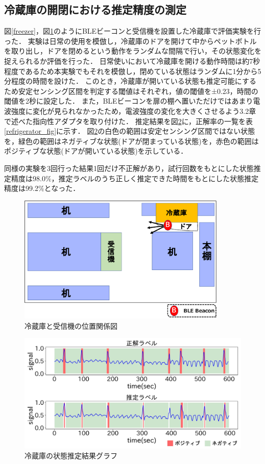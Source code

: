 \subsection{冷蔵庫の開閉における推定精度の測定}
図\ref{freezer}，図\ref{refrigerator_position}のようにBLEビーコンと受信機を設置した冷蔵庫で評価実験を行った．
実験は日常の使用を模倣し，冷蔵庫のドアを開けて中からペットボトルを取り出し，ドアを閉めるという動作をランダムな間隔で行い，その状態変化を捉えられるか評価を行った．
日常使いにおいて冷蔵庫を開ける動作時間は約7秒程度であるため本実験でもそれを模倣し，閉めている状態はランダムに1分から5分程度の時間を設けた．
このとき，冷蔵庫が開いている状態も推定可能にするため安定センシング区間を判定する閾値はそれぞれ，値の閾値を±0.23，時間の閾値を2秒に設定した．
また，BLEビーコンを扉の棚へ置いただけではあまり電波強度に変化が見られなかったため，電波強度の変化を大きくさせるよう3.2章で述べた指向性アダプタを取り付けた．
推定結果を図\ref{refrigerator_graph}に，正解率の一覧を表\ref{refrigerator_fig}に示す．
図\ref{refrigerator_graph}の白色の範囲は安定センシング区間ではない状態を，緑色の範囲はネガティブな状態(ドアが閉まっている状態)を，赤色の範囲はポジティブな状態(ドアが開いている状態)を示している．

同様の実験を3回行った結果1回だけ不正解があり，試行回数をもとにした状態推定精度は98.0\%，推定ラベルのうち正しく推定できた時間をもとにした状態推定精度は99.2\%となった．


\begin{figure}[tbh]
    \centering
    \includegraphics[width=10cm]{images/chapter3/refrigerator_position.pdf}
    \caption{冷蔵庫と受信機の位置関係図}
    \label{refrigerator_position}
\end{figure}


\begin{figure}[tbh]
    \centering
    \includegraphics[width=14cm]{images/chapter3/refrigerator_graph.jpg}
    \caption{冷蔵庫の状態推定結果グラフ}
    \label{refrigerator_graph}
\end{figure}


